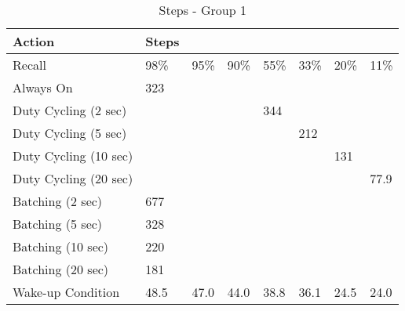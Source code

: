 \iffalse
\begin{table*}[t]
    \begin{tabular}{|l|l|l|l|l|l|l|l|}
    \hline
    Action                & Steps & ~    & ~    & ~   & ~   & ~   & ~    \\ \hline
    Recall                & 98\%  & 95\% & 90\% & 55\% & 33\% & 20\% & 11\% \\ \hline
    Always On             & 323   & ~    & ~    & ~   & ~   & ~   & ~    \\ \hline
    Duty Cycling (2 sec)  & ~     & ~    & ~    & 344 & ~   & ~   & ~    \\ \hline
    Duty Cycling (5 sec)  & ~     & ~    & ~    & ~   & 212 & ~   & ~    \\ \hline
    Duty Cycling (10 sec) & ~     & ~    & ~    & ~   & ~   & 131 & ~    \\ \hline
    Duty Cycling (20 sec) & ~     & ~    & ~    & ~   & ~   & ~   & 77.9 \\ \hline
    Batching (2 sec)      & 677   & ~    & ~    & ~   & ~   & ~   & ~    \\ \hline
    Batching (5 sec)      & 328   & ~    & ~    & ~   & ~   & ~   & ~    \\ \hline
    Batching (10 sec)     & 220   & ~    & ~    & ~   & ~   & ~   & ~    \\ \hline
    Batching (20 sec)     & 181   & ~    & ~    & ~   & ~   & ~   & ~    \\ \hline
    Wake-up Condition     & 48.5  & 47.0 & 44.0 & 38.8 & 36.1 & 24.5 & 24.0 \\ \hline
    \end{tabular}
	\caption{Steps - Group 1}
	\label{table:powerProfileNexus}
\end{table*}

